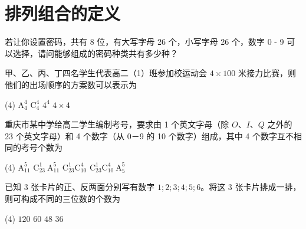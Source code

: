 \section{排列组合的定义}

\begin{example}
    若让你设置密码，共有 8 位，有大写字母 26 个，小写字母 26 个，数字 0 - 9 可以选择，请问能够组成的密码种类共有多少种？
\end{example}

\begin{example}
    甲、乙、丙、丁四名学生代表高二（1）班参加校运动会 $4 \times 100$ 米接力比赛，则他们的出场顺序的方案数可以表示为
    \begin{tasks}(4)
        \task $\mathrm{A}_{4}^{4}$
        \task $\mathrm{C}_{4}^{4}$
        \task $4^{4}$
        \task $4 \times 4$
    \end{tasks}
\end{example}

\begin{example}
    重庆市某中学给高二学生编制考号，要求由 1 个英文字母（除 $O$、$I$、$Q$ 之外的 23 个英文字母）和 4 个数字（从 0－9 的 10 个数字）组成，其中 4 个数字互不相同的考号个数为
    \begin{tasks}(4)
        \task $\mathrm{A}_{11}^{5}$
        \task $\mathrm{C}_{23}^{1} \mathrm{~A}_{11}^{5}$
        \task $\mathrm{C}_{23}^{1} \mathrm{C}_{10}^{4}$
        \task $\mathrm{C}_{23}^{1} \mathrm{C}_{10}^{4} \mathrm{~A}_{5}^{5}$
    \end{tasks}
\end{example}

\begin{example}
    已知 3 张卡片的正、反两面分别写有数字 $1; 2; 3; 4; 5; 6$。将这 3 张卡片排成一排，则可构成不同的三位数的个数为
    \begin{tasks}(4)
        \task $120$
        \task $60$
        \task $48$
        \task $36$
    \end{tasks}
\end{example}
